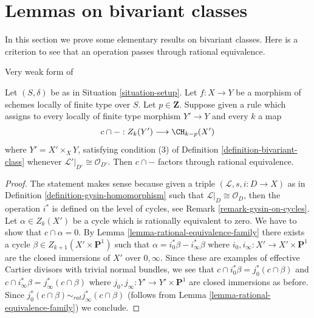\section{Lemmas on bivariant classes}
\label{section-bivariant-II}

\noindent
In this section we prove some elementary results on bivariant classes.
Here is a criterion to see that an operation
passes through rational equivalence.

\begin{lemma}
\label{lemma-factors-through-rational-equivalence}
\begin{reference}
Very weak form of \cite[Theorem 17.1]{F}
\end{reference}
Let $(S, \delta)$ be as in Situation \ref{situation-setup}.
Let $f : X \to Y$ be a morphism of schemes locally of finite type over $S$.
Let $p \in \mathbf{Z}$. Suppose given a rule
which assigns to every locally of finite type morphism $Y' \to Y$
and every $k$ a map
$$
c \cap - : Z_k(Y') \longrightarrow \CH_{k - p}(X')
$$
where $Y' = X' \times_X Y$, satisfying condition (3) of
Definition \ref{definition-bivariant-class}
whenever $\mathcal{L}'|_{D'} \cong \mathcal{O}_{D'}$. Then
$c \cap -$ factors through rational equivalence.
\end{lemma}

\begin{proof}
The statement makes sense because given a triple
$(\mathcal{L}, s, i : D \to X)$ as in
Definition \ref{definition-gysin-homomorphism}
such that $\mathcal{L}|_D \cong \mathcal{O}_D$, then
the operation $i^*$ is defined on the level of cycles, see
Remark \ref{remark-gysin-on-cycles}.
Let $\alpha \in Z_k(X')$ be a cycle which is rationally equivalent to zero.
We have to show that $c \cap \alpha = 0$. By
Lemma \ref{lemma-rational-equivalence-family}
there exists a cycle $\beta \in Z_{k + 1}(X' \times \mathbf{P}^1)$
such that $\alpha = i_0^*\beta - i_\infty^*\beta$
where $i_0, i_\infty : X' \to X' \times \mathbf{P}^1$ are the
closed immersions of $X'$ over $0, \infty$. Since these are
examples of effective Cartier divisors with trivial normal
bundles, we see that $c \cap i_0^*\beta = j_0^*(c \cap \beta)$
and $c \cap i_\infty^*\beta = j_\infty^*(c \cap \beta)$
where $j_0, j_\infty : Y' \to Y' \times \mathbf{P}^1$ are
closed immersions as before. Since
$j_0^*(c \cap \beta) \sim_{rat} j_\infty^*(c \cap \beta)$
(follows from Lemma \ref{lemma-rational-equivalence-family}) we conclude.
\end{proof}


